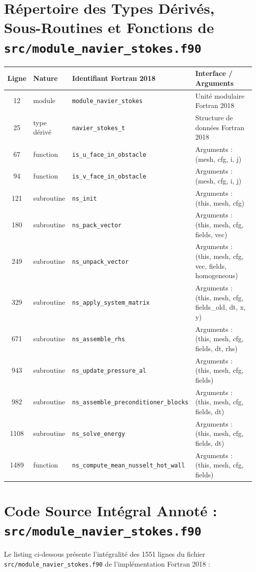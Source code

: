\documentclass[10pt,a4paper,oneside]{book}
\begin{document}
\section{Répertoire des Types Dérivés, Sous-Routines et Fonctions de \texttt{src/module\_navier\_stokes.f90}}
\begin{center}\small
\begin{tabular}{clll}
\toprule
\textbf{Ligne} & \textbf{Nature} & \textbf{Identifiant Fortran 2018} & \textbf{Interface / Arguments} \\
\midrule
12 & module & \texttt{module\_navier\_stokes} & Unité modulaire Fortran 2018 \\
25 & type dérivé & \texttt{navier\_stokes\_t} & Structure de données Fortran 2018 \\
67 & function & \texttt{is\_u\_face\_in\_obstacle} & Arguments : (mesh, cfg, i, j) \\
94 & function & \texttt{is\_v\_face\_in\_obstacle} & Arguments : (mesh, cfg, i, j) \\
121 & subroutine & \texttt{ns\_init} & Arguments : (this, mesh, cfg) \\
180 & subroutine & \texttt{ns\_pack\_vector} & Arguments : (this, mesh, cfg, fields, vec) \\
249 & subroutine & \texttt{ns\_unpack\_vector} & Arguments : (this, mesh, cfg, vec, fields, homogeneous) \\
329 & subroutine & \texttt{ns\_apply\_system\_matrix} & Arguments : (this, mesh, cfg, fields\_old, dt, x, y) \\
671 & subroutine & \texttt{ns\_assemble\_rhs} & Arguments : (this, mesh, cfg, fields, dt, rhs) \\
943 & subroutine & \texttt{ns\_update\_pressure\_al} & Arguments : (this, mesh, cfg, fields) \\
982 & subroutine & \texttt{ns\_assemble\_preconditioner\_blocks} & Arguments : (this, mesh, cfg, fields, dt) \\
1108 & subroutine & \texttt{ns\_solve\_energy} & Arguments : (this, mesh, cfg, fields, dt) \\
1489 & function & \texttt{ns\_compute\_mean\_nusselt\_hot\_wall} & Arguments : (this, mesh, cfg, fields) \\
\bottomrule
\end{tabular}
\end{center}

\section{Code Source Intégral Annoté : \texttt{src/module\_navier\_stokes.f90}}
Le listing ci-dessous présente l'intégralité des 1551 lignes du fichier \texttt{src/module\_navier\_stokes.f90} de l'implémentation Fortran 2018 :
\end{document}
